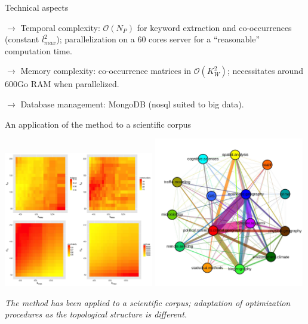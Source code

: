 \documentclass{beamer}
\begin{document}
\begin{frame}{Technical aspects}
	
	$\rightarrow$ Temporal complexity: $\mathcal{O}(N_P)$ for keyword extraction and co-occurrences (constant $l_{max}^2$); parallelization on a 60 cores server for a ``reasonable'' computation time. 
	
	\bigskip
	
	$\rightarrow$ Memory complexity: co-occurrence matrices in $\mathcal{O}(K_W^2)$; necessitates around 600Go RAM when parallelized. 
	
	\bigskip

	$\rightarrow$ Database management: MongoDB (nosql suited to big data).	
	
	
	
	
\end{frame}



\begin{frame}{An application of the method to a scientific corpus}
	 
	 
	 \includegraphics[width=0.49\textwidth]{figures/cyb_Fig6.jpg}
	 \includegraphics[width=0.49\textwidth]{figures/cyb_Fig8.jpg}
	
	\medskip
	
	\textit{The method has been applied to a scientific corpus; adaptation of optimization procedures as the topological structure is different.} \cite{raimbault2017exploration}
	
		
\end{frame}
\end{document}
